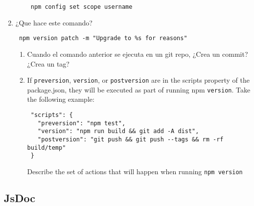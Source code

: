 \begin{enumerate}
\begin{enumerate}
\begin{verbatim}
 npm config set scope username
\end{verbatim}
  \end{enumerate}
\item
  ¿Que hace este comando?

\begin{verbatim}
 npm version patch -m "Upgrade to %s for reasons"
\end{verbatim}

  \begin{enumerate}
  \def\labelenumii{\arabic{enumii}.}
  \item
    Cuando el comando anterior se ejecuta en un git repo, ¿Crea un
    commit? ¿Crea un tag?
  \item
    If \texttt{preversion}, \texttt{version}, or \texttt{postversion}
    are in the scripts property of the package.json, they will be
    executed as part of running npm \texttt{version}. Take the following
    example:

\begin{verbatim}
 "scripts": {
   "preversion": "npm test",
   "version": "npm run build && git add -A dist",
   "postversion": "git push && git push --tags && rm -rf build/temp"
 }
\end{verbatim}

    Describe the set of actions that will happen when running
    \texttt{npm version}
  \end{enumerate}
\end{enumerate}

\subsection{JsDoc}\label{jsdoc}

